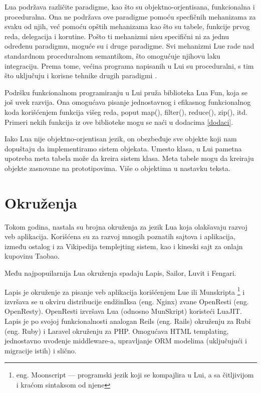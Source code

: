 \documentclass[a4paper]{article}
\begin{document}

Lua podržava različite paradigme, kao što su objektno-orjentisana, funkcionalna i proceduralna. Ona ne podržava ove paradigme pomoću specfičnih mehanizama za svaku od njih, već pomoću opštih mehanizama kao što su tabele, funkcije prvog reda, delegacija i korutine. Pošto ti mehanizmi nisu specifični ni za jednu određenu paradigmu, moguće su i druge paradigme. Svi mehanizmi Lue rade nad standardnom proceduralnom semantikom, što omogućuje njihovu laku integraciju. Prema tome, većina programa napisanih u Lui su proceduralni, s tim što uključuju i korisne tehnike drugih paradigmi \cite{multiParadigms} .

Podršku funkcionalnom programiranju u Lui pruža biblioteka Lua Fun, koja se još uvek razvija. Ona omogućava pisanje jednostavnog i efikasnog funkcionalnog koda korišćenjem funkcija višeg reda, poput map(), filter(), reduce(), zip(), itd. Primeri nekih funkcija iz ove biblioteke mogu se naći u dodacima \ref{dodaci}.



Iako Lua nije objektno-orjentisan jezik, on obezbeđuje sve objekte koji nam dopuštaju da implementiramo sistem objekata. Umesto klasa, u Lui pametna upotreba meta tabela može da kreira sistem klasa. Meta tabele mogu da kreiraju objekte zasnovane na prototipovima. Više o objektima u nastavku teksta.


\section{Okruženja}
\label{sec:okruzenja}


Tokom godina, nastala su brojna okruženja za jezik Lua koja olakšavaju razvoj veb aplikacija. Korišćena su za razvoj mnogih poznatih sajtova i aplikacija, između ostalog i za Vikipedija templejting sistem, kao i kineski sajt za onlajn kupovinu Taobao.

Među najpopuilarnija Lua okruženja spadaju Lapis, Sailor, Luvit i Fengari.

Lapis je okruženje za pisanje veb aplikacija korišćenjem Lue ili Munskripta \footnote{eng. Moonscript --- programski jezik koji se kompajlira u Lui, a sa čitljivijom i kraćom sintaksom od njene} i izvršava se u okviru distribucije endžinIksa (eng. Nginx) zvane OpenResti (eng. OpenResty). OpenResti izvršava Lua (odnosno MunSkript) koristeći LuaJIT. Lapis je po svojoj funkcionalnosti analogan Reils (eng. Rails) okruženju za Rubi (eng. Ruby) i Laravel okruženju za PHP. Omogućava HTML templating, jednostavno uvođenje middleware-a, upravljanje ORM modelima (uključujući i migracije istih) i slično. 
\end{document}
